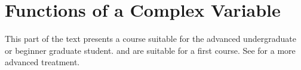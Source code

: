 \part{Functions of a Complex Variable}

This part of the text presents a course suitable for the advanced undergraduate
or beginner graduate student.  \cite{churchill:1990} and \cite{saff:1993}
are suitable for a first course.  See \cite{carrier:1983} for a more advanced
treatment.
















